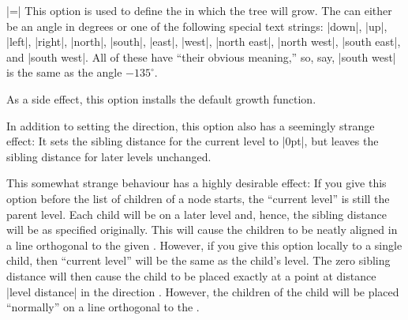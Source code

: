 \begin{itemize}
\begin{codeexample}[]
\end{codeexample}
  
  |=|
  This option is used to define the  in which the tree
  will grow. The  can either be an angle in degrees or
  one of the following special text strings: |down|, |up|, |left|,
  |right|, |north|, |south|, |east|, |west|, |north east|,
  |north west|, |south east|, and |south west|. All of these have
  ``their obvious meaning,'' so, say, |south west| is the same as the
  angle $-135^\circ$.

  As a side effect, this option installs the default growth function.

  In addition to setting the direction, this option also has a
  seemingly strange effect: It sets the sibling distance for the
  current level to |0pt|, but leaves the sibling distance for later
  levels unchanged.

  This somewhat strange behaviour has a highly desirable effect: If
  you give this option before the list of children of a node starts,
  the ``current level'' is still the parent level. Each child will be
  on a later level and, hence, the sibling distance will be as
  specified originally. This will cause the children to be neatly
  aligned in a line orthogonal to the given . However,
  if you give this option locally to a single child, then ``current
  level'' will be the same as the child's level. The zero sibling
  distance will then cause the child to be placed exactly at a point
  at distance |level distance| in the direction
  . However, the children of the child will be placed
  ``normally'' on a line orthogonal to the .


\end{itemize}
